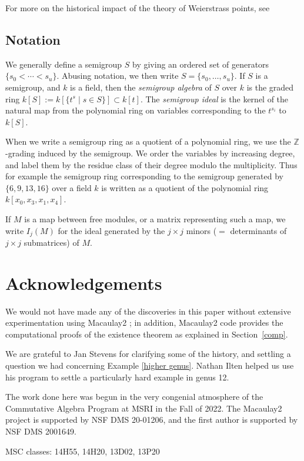 \documentclass[twoside,12pt, leqno]{amsart}
\theoremstyle{definition}
\def\ZZ{{\mathbb Z}}
\begin{document}
For more on the historical impact of the theory of Weierstrass points, see~\cite{MR2403373}

\subsection*{Notation}
We generally define a semigroup
$S$ by giving an ordered set of generators $\{s_{0}< \cdots <s_{u}\}$. Abusing notation, we
then write $S = \{s_{0}, \dots, s_{u}\}$. If $S$ is a semigroup, and $k$ is a field, then the \emph{semigroup algebra} of $S$ over $k$ is the
graded ring $k[S] :=  k[\{t^{s}\mid s\in S\}] \subset k[t]$. The \emph{semigroup ideal}
is the kernel of the natural map from the polynomial ring on variables corresponding to the
$t^{s_{i}}$ to $k[S]$.

When we write a semigroup ring as a quotient of a polynomial ring, we use the $\ZZ$-grading induced by the semigroup. We order the variables by increasing degree, and label them by the residue class of their degree modulo the multiplicity. Thus for example
the semigroup ring corresponding to the semigroup generated by $\{6,9,13,16\}$ over a field $k$ is written as a quotient of the polynomial ring
$k[x_0, x_3, x_1, x_4]$.

If $M$ is a map between free modules, or a matrix representing such a map, we write $I_j(M)$ for the ideal generated by the $j\times j$ minors ($=$ determinants of $j\times j$ submatrices) of $M$.


\section*{Acknowledgements}
We would not have made any of the discoveries in this paper without extensive experimentation using  Macaulay2 \cite{M2}; in addition, Macaulay2 code provides the computational proofs of the existence theorem as explained in Section~\ref{comp}. 

We are grateful to Jan Stevens for clarifying some of the history, and settling a question we had concerning Example \ref{higher genus}.
Nathan Ilten helped us use his program \cite{VersalDeformationsSource} to settle a particularly hard example in genus 12.

The work done here was begun in the very congenial atmosphere of the Commutative Algebra Program at MSRI in the Fall of 2022. The Macaulay2 project is supported by  NSF DMS 20-01206, and the first author is supported by NSF DMS 2001649.

MSC classes:	14H55, 14H20, 13D02, 13P20
\end{document}
